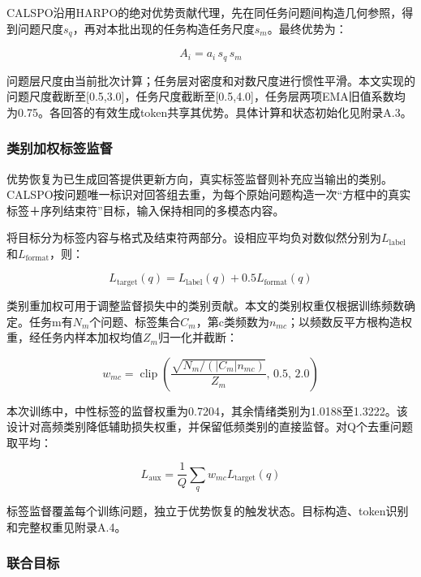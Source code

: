 \documentclass[UTF8,a4paper,11pt,fontset=windows]{ctexart}
\begin{document}
CALSPO沿用HARPO的绝对优势贡献代理\cite{ref8}，先在同任务问题间构造几何参照，得到问题尺度$s_q$，再对本批出现的任务构造任务尺度$s_m$。最终优势为：

\begin{equation}
A_i=a_i\,s_q\,s_m\label{eq:3}
\end{equation}

问题层尺度由当前批次计算；任务层对密度和对数尺度进行惯性平滑。本文实现的问题尺度截断至[0.5,3.0]，任务尺度截断至[0.5,4.0]，任务层两项EMA旧值系数均为0.75。各回答的有效生成token共享其优势。具体计算和状态初始化见附录A.3。

\subsubsection{类别加权标签监督}

优势恢复为已生成回答提供更新方向，真实标签监督则补充应当输出的类别。CALSPO按问题唯一标识对回答组去重，为每个原始问题构造一次“方框中的真实标签＋序列结束符”目标，输入保持相同的多模态内容。

将目标分为标签内容与格式及结束符两部分。设相应平均负对数似然分别为$L_{\mathrm{label}}$和$L_{\mathrm{format}}$，则：

\begin{equation}
L_{\mathrm{target}}(q)=L_{\mathrm{label}}(q)+0.5L_{\mathrm{format}}(q)\label{eq:4}
\end{equation}

类别重加权可用于调整监督损失中的类别贡献\cite{ref5}。本文的类别权重仅根据训练频数确定。任务m有$N_m$个问题、标签集合$C_m$，第c类频数为$n_{mc}$；以频数反平方根构造权重，经任务内样本加权均值$Z_m$归一化并截断：

\begin{equation}
w_{mc}=\operatorname{clip}\!\left(\frac{\sqrt{N_m/(|C_m|n_{mc})}}{Z_m},\,0.5,\,2.0\right)\label{eq:5}
\end{equation}

本次训练中，中性标签的监督权重为0.7204，其余情绪类别为1.0188至1.3222。该设计对高频类别降低辅助损失权重，并保留低频类别的直接监督。对Q个去重问题取平均：

\begin{equation}
L_{\mathrm{aux}}=\frac{1}{Q}\sum_q w_{mc}L_{\mathrm{target}}(q)\label{eq:6}
\end{equation}

标签监督覆盖每个训练问题，独立于优势恢复的触发状态。目标构造、token识别和完整权重见附录A.4。

\subsubsection{联合目标}
\end{document}
